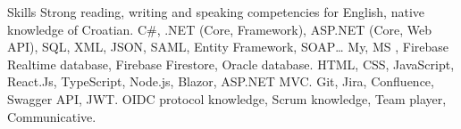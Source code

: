 
\begin{rubric}{Skills}
	\entry*[Languages]
	Strong reading, writing and speaking competencies for English, native knowledge of Croatian.
	C\#, .NET (Core, Framework), ASP.NET (Core, Web API), SQL, XML, JSON, SAML, Entity Framework, SOAP\ldots
	\entry*[Databases]
	My, MS  , Firebase Realtime database, Firebase Firestore, Oracle database.
	HTML, CSS, JavaScript, React.Js, TypeScript, Node.js, Blazor, ASP.NET MVC.
	\entry*[Tools.]
	Git, Jira, Confluence, Swagger API, JWT.
	\entry*[Misc.]
	OIDC protocol knowledge, Scrum knowledge, Team player, Communicative.
\end{rubric}
